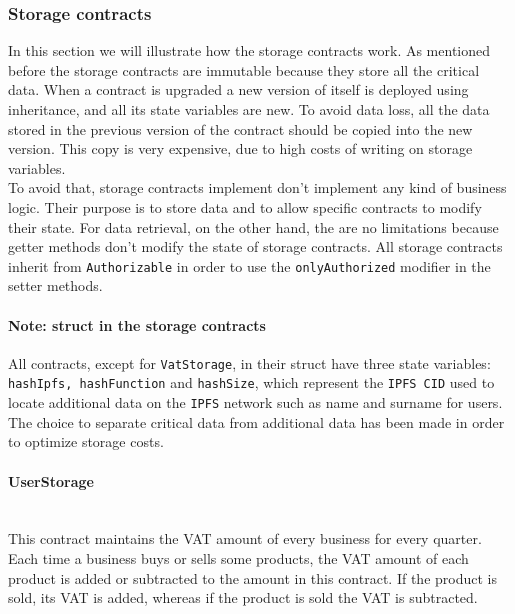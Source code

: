 \hypertarget{st}{\subsubsection{Storage contracts}}
In this section we will illustrate how the storage contracts work. As mentioned before the storage contracts are immutable because they store all the critical data. When a contract is upgraded a new version of itself is deployed using inheritance, and all its state variables are new. To avoid data loss, all the data stored in the previous version of the contract should be copied into the new version. This copy is very expensive, due to high costs of writing on storage variables.\\
To avoid that, storage contracts implement don't implement any kind of business logic. Their purpose is to store data and to allow specific contracts to modify their state. For data retrieval, on the other hand, the are no limitations because getter methods don't modify the state of storage contracts.
All storage contracts inherit from \texttt{Authorizable} in order to use the \texttt{onlyAuthorized} modifier in the setter methods.
\paragraph*{Note: struct in the storage contracts}
All contracts, except for \texttt{VatStorage}, in their struct have three state variables: \texttt{hashIpfs, hashFunction} and \texttt{hashSize}, which represent the \texttt{IPFS CID} used to locate additional data on the \texttt{IPFS} network such as name and surname for users. The choice to separate critical data from additional data has been made in order to optimize storage costs.
\pagebreak
\paragraph{UserStorage}\mbox{}\\

\noindent This contract maintains the VAT amount of every business for every quarter. Each time a business buys or sells some products, the VAT amount of each product is added or subtracted to the amount in this contract. If the product is sold, its VAT is added, whereas if the product is sold the VAT is subtracted. \\

